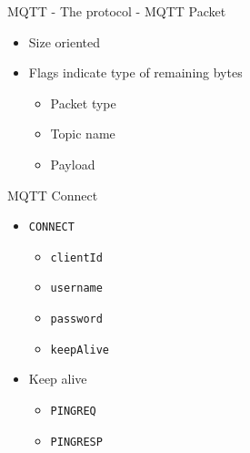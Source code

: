 \begin{frame}{MQTT - The protocol - MQTT Packet}
\protect\hypertarget{mqtt---the-protocol---mqtt-packet}{}

\begin{itemize}
\tightlist
\item
  Size oriented
\item
  Flags indicate type of remaining bytes

  \begin{itemize}
  \tightlist
  \item
    Packet type
  \item
    Topic name
  \item
    Payload
  \end{itemize}
\end{itemize}


\end{frame}

\begin{frame}[fragile]{MQTT Connect}
\protect\hypertarget{mqtt-connect}{}

\begin{itemize}
\tightlist
\item
  \texttt{CONNECT}

  \begin{itemize}
  \tightlist
  \item
    \texttt{clientId}
  \item
    \texttt{username}
  \item
    \texttt{password}
  \item
    \texttt{keepAlive}
  \end{itemize}
\end{itemize}

\begin{itemize}
\tightlist
\item
  Keep alive

  \begin{itemize}
  \tightlist
  \item
    \texttt{PINGREQ}
  \item
    \texttt{PINGRESP}
  \end{itemize}
\end{itemize}

\end{frame}

